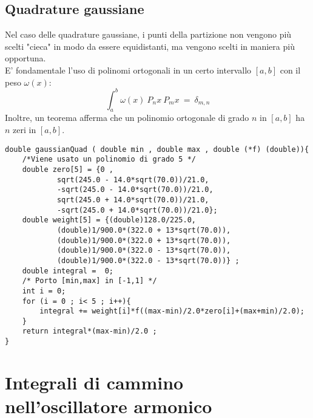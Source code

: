 \subsection*{Quadrature gaussiane}
Nel caso delle quadrature gaussiane, i punti della partizione non vengono più scelti
"cieca" in modo da essere equidistanti, ma vengono scelti in maniera più opportuna.\\
E' fondamentale l'uso di polinomi ortogonali in un certo intervallo $[a,b]$ con il peso $\omega(x)$:
$$
	\int_a^b \omega(x)\ P_n{x} \ P_m{x} \ = \ \delta_{m,n}
$$
Inoltre, un teorema afferma che un polinomio ortogonale di grado $n$ in $[a,b]$ ha $n$ zeri in $[a,b]$.\\

\begin{verbatim}
double gaussianQuad ( double min , double max , double (*f) (double)){
	/*Viene usato un polinomio di grado 5 */
	double zero[5] = {0 ,
			sqrt(245.0 - 14.0*sqrt(70.0))/21.0,
			-sqrt(245.0 - 14.0*sqrt(70.0))/21.0,
			sqrt(245.0 + 14.0*sqrt(70.0))/21.0,
			-sqrt(245.0 + 14.0*sqrt(70.0))/21.0};
	double weight[5] = {(double)128.0/225.0,
			(double)1/900.0*(322.0 + 13*sqrt(70.0)),
			(double)1/900.0*(322.0 + 13*sqrt(70.0)),
			(double)1/900.0*(322.0 - 13*sqrt(70.0)),
			(double)1/900.0*(322.0 - 13*sqrt(70.0))} ;
	double integral =  0;
	/* Porto [min,max] in [-1,1] */
	int i = 0;
	for (i = 0 ; i< 5 ; i++){
		integral += weight[i]*f((max-min)/2.0*zero[i]+(max+min)/2.0);
	}
	return integral*(max-min)/2.0 ;
}
\end{verbatim}
\section{Integrali di cammino nell'oscillatore armonico}




